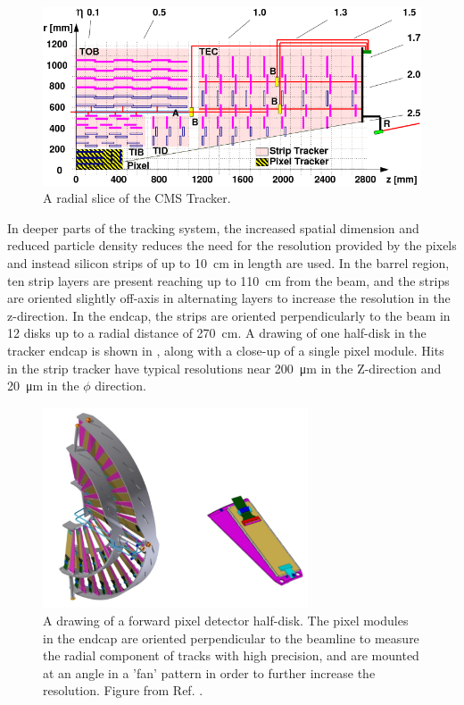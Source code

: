 \begin{figure}[htbp]
    \includegraphics[width=1.1\textwidth]{figures/cms_tracker.png}
    \centering
    \caption{A radial slice of the CMS Tracker.}
    \label{fig:cmsTracker}
\end{figure}

In deeper parts of the tracking system, the increased spatial dimension and reduced particle density reduces the need for the resolution provided by the pixels and instead silicon strips of up to \SI{10}{\centi\meter} in length are used. 
In the barrel region, ten strip layers are present reaching up to \SI{110}{\centi\meter} from the beam, and the strips are oriented slightly off-axis in alternating layers to increase the resolution in the z-direction. 
In the endcap, the strips are oriented perpendicularly to the beam in 12 disks up to a radial distance of \SI{270}{\centi\meter}.
A drawing of one half-disk in the tracker endcap is shown in , along with a close-up of a single pixel module.
Hits in the strip tracker have typical resolutions near \SI{200}{\micro\meter} in the Z-direction and \SI{20}{\micro\meter} in the $\phi$ direction.

\begin{figure}[htbp]
    \includegraphics[width=0.7\textwidth]{figures/fpix_drawing.png}
    \centering
	\caption[Schematic of a forward tracker half-disk]{A drawing of a forward pixel detector half-disk. The pixel modules in the endcap are oriented perpendicular to the beamline to measure the radial component of tracks with high precision, and are mounted at an angle in a 'fan' pattern in order to further increase the resolution. Figure from Ref. \cite{pixelUpgrade}.}
    \label{fig:fpixExample}
\end{figure}

